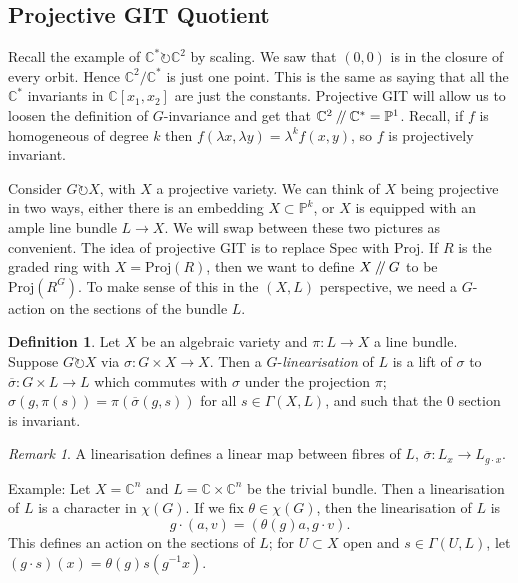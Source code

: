 \documentclass{article}
\theoremstyle{definition}
\newtheorem{definition}[theorem]{Definition}
\theoremstyle{remark}
\newtheorem{remark}[theorem]{Remark}
\numberwithin{theorem}{section}
\newcommand{\C}{\mathbb{C}}
\newcommand{\bP}{\mathbb{P}}
\newcommand{\sslash}{\mathbin{/\mkern-4mu/}}
\newcommand{\Spec}{\text{Spec}}
\newcommand{\Proj}{\text{Proj}}
\newenvironment{defn}{
	\begin{mdframed}
		\vspace{-0.5em}
		\begin{definition}
		}{
		\end{definition}
	\end{mdframed}
}
\begin{document}
\subsection{Projective GIT Quotient}

Recall the example of $\C^\ast \circlearrowright \C^2$ by scaling. We saw that $(0,0)$ is in the closure of every orbit. Hence $\C^2/\C^\ast$ is just one point. This is the same as saying that all the $\C^\ast$ invariants in $\C[x_1,x_2]$ are just the constants. Projective GIT will allow us to loosen the definition of $G$-invariance and get that $\C^2\sslash \C^\ast = \bP^1$. Recall, if $f$ is homogeneous of degree $k$ then $f(\lambda x, \lambda y)= \lambda^k f(x,y)$, so $f$ is projectively invariant. \vspace{1em}

Consider $G\circlearrowright X$, with $X$ a projective variety. We can think of $X$ being projective in two ways, either there is an embedding $X\subset \bP^k$, or $X$ is equipped with an ample line bundle $L\to X$. We will swap between these two pictures as convenient. The idea of projective GIT is to replace $\Spec$ with $\Proj$. If $R$ is the graded ring with $X=\Proj(R)$, then we want to define $X\sslash G$ to be $\Proj(R^G)$. To make sense of this in the $(X,L)$ perspective, we need a $G$-action on the sections of the bundle $L$.

\begin{defn}
	Let $X$ be an algebraic variety and $\pi:L\to X$ a line bundle. Suppose $G\circlearrowright X$ via $\sigma:G\times X\to X$. Then a $G$-\emph{linearisation} of $L$ is a lift of $\sigma$ to $\overline{\sigma}:G\times L\to L$ which commutes with $\sigma$ under the projection $\pi$; $\sigma(g,\pi(s))=\pi(\overline{\sigma}(g,s))$ for all $s\in\Gamma(X,L)$, and such that the $0$ section is invariant.
\end{defn}
\begin{remark}
 A linearisation defines a linear map between fibres of $L$, $\overline{\sigma}:L_x\to L_{g\cdot x}$.
\end{remark}
	
	Example: Let $X=\C^n$ and $L=\C\times \C^n$ be the trivial bundle. Then a linearisation of $L$ is a character in $\chi(G)$. If we fix $\theta \in \chi(G)$, then the linearisation of $L$ is 
	\begin{equation}
		g\cdot(a,v) = (\theta(g)a,g\cdot v).
	\end{equation}
	This defines an action on the sections of $L$; for $U\subset X$ open and $s\in\Gamma(U,L)$, let $(g\cdot s)(x) = \theta(g)s(g^{-1}x)$.
	\vspace{1em}
	
\end{document}
